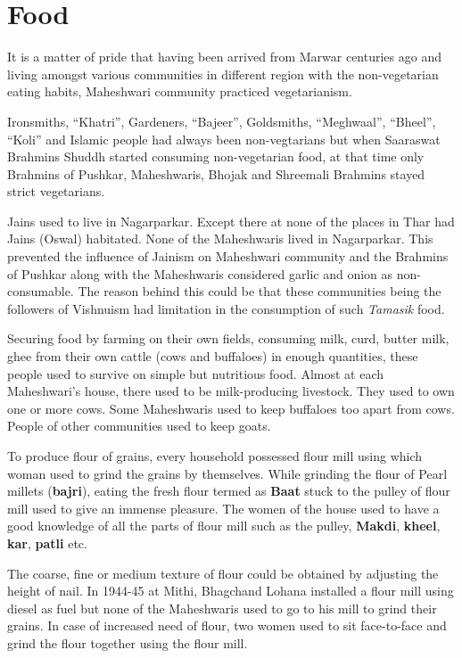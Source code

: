 \section{Food}
It is a matter of pride that having been arrived from Marwar centuries ago and
living amongst various communities in different region with the non-vegetarian
eating habits, Maheshwari community practiced vegetarianism.

Ironsmiths, ``Khatri'', Gardeners, ``Bajeer'', Goldsmiths, ``Meghwaal'',
``Bheel'', ``Koli'' and Islamic people had always been non-vegtarians but when
Saaraswat Brahmins Shuddh started consuming non-vegetarian food, at that time
only Brahmins of Pushkar, Maheshwaris, Bhojak and Shreemali Brahmins stayed
strict vegetarians.

Jains used to live in Nagarparkar. Except there at none of the places in Thar
had Jains (Oswal) habitated. None of the Maheshwaris lived in Nagarparkar. This
prevented the influence of Jainism on Maheshwari community and the Brahmins of
Pushkar along with the Maheshwaris considered garlic and onion as
non-consumable. The reason behind this could be that these communities being the
followers of Vishnuism had limitation in the consumption of such \textit{Tamasik} food.

Securing food by farming on their own fields, consuming milk, curd, butter milk,
ghee from their own cattle (cows and buffaloes) in enough quantities, these
people used to survive on simple but nutritious food. Almost at each
Maheshwari's house, there used to be milk-producing livestock. They used to own
one or more cows. Some Maheshwaris used to keep buffaloes too apart from cows.
People of other communities used to keep goats.

To produce flour of grains, every household possessed flour mill using which
woman used to grind the grains by themselves. While grinding the flour of Pearl
millets (\textbf{bajri}), eating the fresh flour termed as \textbf{Baat} stuck
to the pulley of flour mill used to give an immense pleasure. The women
of the house used to have a good knowledge of all the parts of flour mill such
as the pulley, \textbf{Makdi}, \textbf{kheel}, \textbf{kar},
\textbf{patli} etc.

The coarse, fine or medium texture of flour could be obtained by adjusting the
height of nail. In 1944-45 at Mithi, Bhagchand Lohana installed a flour mill
using diesel as fuel but none of the Maheshwaris used to go to his mill to grind
their grains. In case of increased need of flour, two women used to sit
face-to-face and grind the flour together using the flour mill.

